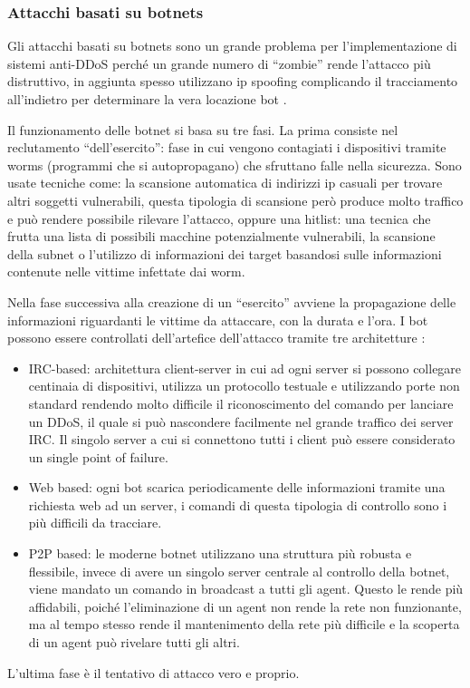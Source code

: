 \subsubsection{Attacchi basati su botnets}

Gli attacchi basati su botnets sono un grande problema per l'implementazione di sistemi anti-DDoS perché un grande numero di ``zombie'' rende l'attacco più distruttivo, in aggiunta spesso utilizzano ip spoofing complicando il tracciamento all'indietro per determinare la vera locazione bot \cite{ddos_survey_1}.

Il funzionamento delle botnet si basa su tre fasi. La prima consiste nel reclutamento ``dell'esercito'': fase in cui vengono contagiati i dispositivi tramite worms (programmi che si autopropagano) che sfruttano falle nella sicurezza. Sono usate tecniche come: la scansione automatica di indirizzi ip casuali per trovare altri soggetti vulnerabili, questa tipologia di scansione però produce molto traffico e può rendere possibile rilevare l'attacco, oppure una hitlist: una tecnica che frutta una lista di possibili macchine potenzialmente vulnerabili, la scansione della subnet o l'utilizzo di informazioni dei target basandosi sulle informazioni contenute nelle vittime infettate dai worm.


Nella fase successiva alla creazione di un ``esercito'' avviene la propagazione delle informazioni riguardanti le vittime da attaccare, con la durata e l'ora.
I bot possono essere controllati dell'artefice dell'attacco tramite tre architetture \cite{ddos_survey_4}: %
\begin{itemize}
    \item IRC-based: architettura client-server in cui ad ogni server si possono collegare centinaia di dispositivi, utilizza un protocollo testuale e utilizzando porte non standard rendendo molto difficile il riconoscimento del comando per lanciare un DDoS, il quale si può nascondere facilmente nel grande traffico dei server IRC. Il singolo server a cui si connettono tutti i client può essere considerato un single point of failure.
    \item Web based: ogni bot scarica periodicamente delle informazioni tramite una richiesta web ad un server, i comandi di questa tipologia di controllo sono i più difficili da tracciare.
    \item P2P based: le moderne botnet utilizzano una struttura più robusta e flessibile, invece di avere un singolo server centrale al controllo della botnet, viene mandato un comando in broadcast a tutti gli agent. Questo le rende più affidabili, poiché l'eliminazione di un agent non rende la rete non funzionante, ma al tempo stesso rende il mantenimento della rete più difficile e la scoperta di un agent può rivelare tutti gli altri. 
\end{itemize}
L'ultima fase è il tentativo di attacco vero e proprio.

